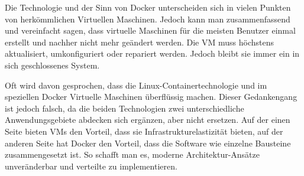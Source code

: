 
Die Technologie und der Sinn von Docker unterscheiden sich in vielen Punkten von herkömmlichen Virtuellen Maschinen. Jedoch kann man zusammenfassend und vereinfacht sagen, dass virtuelle Maschinen für die meisten Benutzer einmal erstellt und nachher nicht mehr geändert werden. Die VM muss höchstens aktualisiert, umkonfiguriert oder repariert werden. Jedoch bleibt sie immer ein in sich geschlossenes System. \cite{DockerVsVm}

Oft wird davon gesprochen, dass die Linux-Containertechnologie und im speziellen Docker Virtuelle Maschinen überflüssig machen. Dieser Gedankengang ist jedoch falsch, da die beiden Technologien zwei unterschiedliche Anwendungsgebiete abdecken sich ergänzen, aber nicht ersetzen. Auf der einen Seite bieten VMs den Vorteil, dass sie Infrastrukturelastizität bieten, auf der anderen Seite hat Docker den Vorteil, dass die Software wie einzelne Bausteine zusammengesetzt ist. So schafft man es, moderne Architektur-Ansätze unveränderbar und verteilte zu implementieren. \cite{DockerVsVm}
